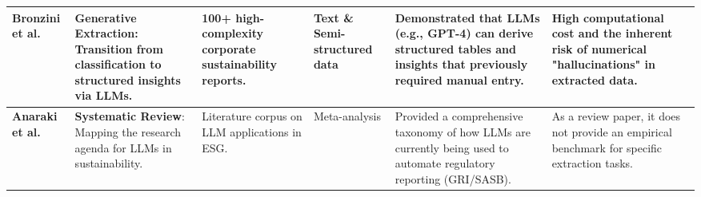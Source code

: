 \begin{landscape}
\begin{table}[p]
\begin{tabularx}{\linewidth}{|p{1.8cm}|p{3.5cm}|p{3cm}|p{1.8cm}|X|X|}
\textbf{Bronzini et al.}  \parencite{marco_bronzini_bf94d949} & \textbf{Generative Extraction}: Transition from classification to structured insights via LLMs. & 100+ high-complexity corporate sustainability reports. & Text \& Semi-structured data & Demonstrated that LLMs (e.g., GPT-4) can derive structured tables and insights that previously required manual entry. & High computational cost and the inherent risk of numerical "hallucinations" in extracted data. \\ \hline
\textbf{Anaraki et al.}  \parencite{seyed_alireza_mousavian_anaraki_b56a1c0f} & \textbf{Systematic Review}: Mapping the research agenda for LLMs in sustainability. & Literature corpus on LLM applications in ESG. & Meta-analysis & Provided a comprehensive taxonomy of how LLMs are currently being used to automate regulatory reporting (GRI/SASB). & As a review paper, it does not provide an empirical benchmark for specific extraction tasks. \\ \hline
\end{tabularx}
\end{table}
\end{landscape}



